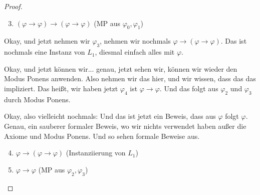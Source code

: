 \begin{proof}
\begin{math-stroke}
\begin{enumerate}[label=$\varphi_{\mathbf{\arabic*}}:$]
    \setcounter{enumi}{2} \item $(\varphi \rightarrow \varphi) \rightarrow (\varphi \rightarrow \varphi)$ \hfill (MP aus $\varphi_0, \varphi_1$)
\end{enumerate}
\end{math-stroke}

\begin{spoken-clean}[00:37:52 - 00:38:56]
Okay, und jetzt nehmen wir $\varphi_3$, nehmen wir nochmals $\varphi \rightarrow (\varphi \rightarrow \varphi)$. Das ist nochmals eine Instanz von $L_1$, diesmal einfach alles mit $\varphi$.

Okay, und jetzt können wir... genau, jetzt sehen wir, können wir wieder den Modus Ponens anwenden. Also nehmen wir das hier, und wir wissen, dass das das impliziert. Das heißt, wir haben jetzt $\varphi_4$ ist $\varphi \rightarrow \varphi$. Und das folgt aus $\varphi_2$ und $\varphi_3$ durch Modus Ponens.

Okay, also vielleicht nochmals: Und das ist jetzt ein Beweis, dass aus $\varphi$ folgt $\varphi$. Genau, ein sauberer formaler Beweis, wo wir nichts verwendet haben außer die Axiome und Modus Ponens. Und so sehen formale Beweise aus.
\end{spoken-clean}

\begin{math-stroke}
\begin{enumerate}[label=$\varphi_{\mathbf{\arabic*}}:$]
    \setcounter{enumi}{3} \item $\varphi \rightarrow (\varphi \rightarrow \varphi)$ \hfill (Instanziierung von $L_1$)
    \item $\varphi \rightarrow \varphi$ \hfill (MP aus $\varphi_2, \varphi_3$)
\end{enumerate}
\end{math-stroke}
\end{proof}

